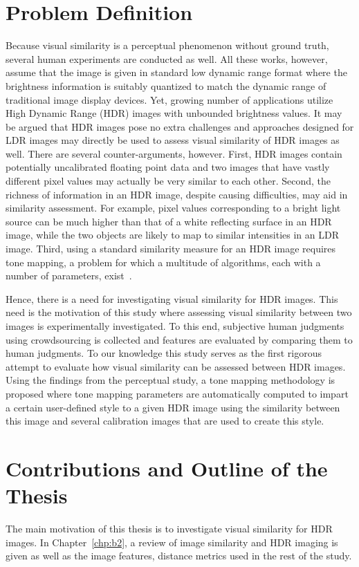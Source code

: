 \section{ Problem Definition}
Because visual similarity is a perceptual phenomenon without ground truth, several human experiments are conducted as well. All these works, however, assume that the image is given in standard low dynamic range format where the brightness information is suitably quantized to match the dynamic range of traditional image display devices. Yet, growing number of applications utilize High Dynamic Range (HDR) images with unbounded brightness values. It may be argued that HDR images pose no extra challenges and approaches designed for LDR images may directly be used to assess visual similarity of HDR images as well. There are several counter-arguments, however. First, HDR images contain potentially uncalibrated floating point data and two images that have vastly different pixel values may actually be very similar to each other. Second, the richness of information in an HDR image, despite causing difficulties, may  aid in similarity assessment. For example, pixel values corresponding to a bright light source can be much higher than that of a white reflecting surface in an HDR image, while the two objects are likely to map to similar intensities in an LDR image. Third, using a standard similarity measure for an HDR image requires tone mapping, a problem for which a multitude of algorithms, each with a number of parameters, exist~\cite{yeganeh2012objective}.

Hence, there is a need for investigating visual similarity for HDR images. This need is the motivation of this study where assessing visual similarity between two images is experimentally investigated. To this end, subjective human judgments using crowdsourcing is collected and features  are evaluated by comparing them to human judgments. To our knowledge this study serves as the first rigorous attempt to evaluate how visual similarity can be assessed between HDR images. Using the findings from the perceptual study, a tone mapping methodology is proposed where tone mapping parameters are automatically computed to impart a certain user-defined style to a given HDR image using the similarity between this image and several calibration images that are used to create this style.

\section{Contributions and Outline of the Thesis}
The main motivation of this thesis is to investigate visual similarity for HDR images. In Chapter~\ref{chp:b2}, a review of image similarity and HDR imaging is given as well as the image features, distance metrics used in the rest of the study.

